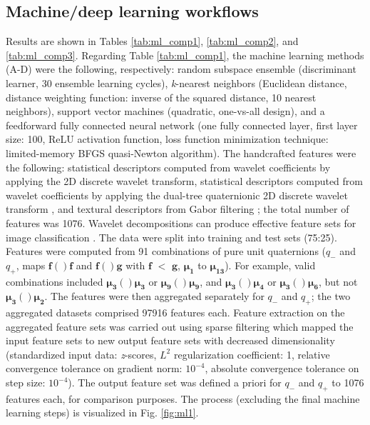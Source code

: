 \documentclass[superscriptaddress,longbibliography,aps,prl,twocolumn,10pt]{revtex4-2}
\begin{document}
\subsection*{\normalsize{Machine/deep learning workflows}}
Results are shown in Tables \ref{tab:ml_comp1}, \ref{tab:ml_comp2}, and \ref{tab:ml_comp3}. Regarding Table \ref{tab:ml_comp1}, the machine learning methods (A-D) were the following, respectively: random subspace ensemble \cite{TinKamHo1998} (discriminant learner, 30 ensemble learning cycles), \textit{k}-nearest neighbors \cite{Sproull1991} (Euclidean distance, distance weighting function: inverse of the squared distance, 10 nearest neighbors), support vector machines \cite{ChihWeiHsu2002} (quadratic, one-vs-all design), and a feedforward fully connected neural network \cite{Liu1989} (one fully connected layer, first layer size: 100, ReLU activation function, loss function minimization technique: limited-memory BFGS quasi-Newton algorithm). The handcrafted features were the following: statistical descriptors \cite{RojasMoraleda2016} computed from wavelet coefficients by applying the 2D discrete wavelet transform, statistical descriptors \cite{RojasMoraleda2016} computed from wavelet coefficients by applying the dual-tree quaternionic 2D discrete wavelet transform \cite{WaiLamChan2008}, and textural descriptors from Gabor filtering \cite{Bianconi2007}; the total number of features was 1076. Wavelet decompositions can produce effective feature sets for image classification \cite{RojasMoraleda2016}. The data were split into training and test sets (75:25). Features were computed from 91 combinations of pure unit quaternions ($q_-$ and $q_+$, maps $\boldsymbol{f}()\boldsymbol{f}$ and $\boldsymbol{f}()\boldsymbol{g}$ with $\boldsymbol{f}$ $<$ $\boldsymbol{g}$, $\boldsymbol{\mu_{1}}$ to $\boldsymbol{\mu_{13}}$). For example, valid combinations included $\boldsymbol{\mu_{3}}()\boldsymbol{\mu_{3}}$ or $\boldsymbol{\mu_{9}}()\boldsymbol{\mu_{9}}$, and $\boldsymbol{\mu_{3}}()\boldsymbol{\mu_{4}}$ or $\boldsymbol{\mu_{3}}()\boldsymbol{\mu_{6}}$, but not $\boldsymbol{\mu_{3}}()\boldsymbol{\mu_{2}}$. The features were then aggregated separately for $q_-$ and $q_+$; the two aggregated datasets comprised 97916 features each. Feature extraction on the aggregated feature sets was carried out using sparse filtering \cite{Ngiam2011} which mapped the input feature sets to new output feature sets with decreased dimensionality (standardized input data: \textit{z}-scores, $L^2$ regularization coefficient: 1, relative convergence tolerance on gradient norm: $10^{-4}$, absolute convergence tolerance on step size: $10^{-4}$). The output feature set was defined a priori for $q_-$ and $q_+$ to 1076 features each, for comparison purposes. The process (excluding the final machine learning steps) is visualized in Fig. \ref{fig:ml1}.
\end{document}
